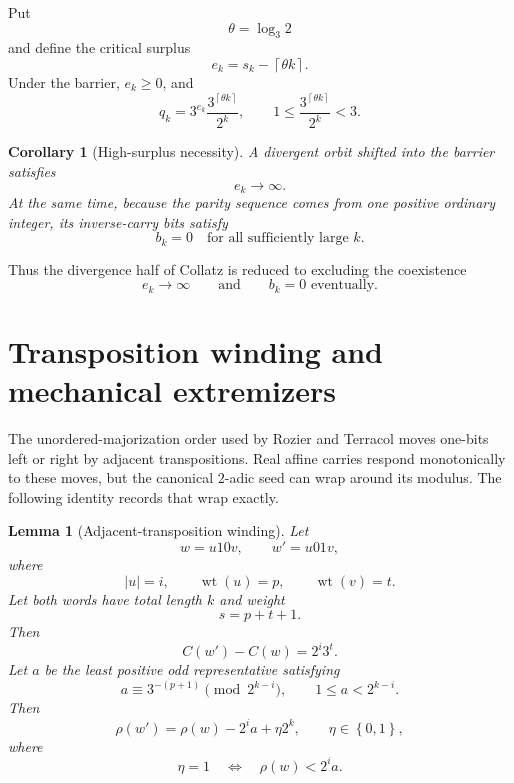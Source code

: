 \documentclass[11pt,reqno]{amsart}
\numberwithin{equation}{section}
\newtheorem{lemma}[theorem]{Lemma}
\newtheorem{corollary}[theorem]{Corollary}
\theoremstyle{definition}
\theoremstyle{remark}
\newcommand{\set}[1]{\left\{#1\right\}}
\newcommand{\ceil}[1]{\left\lceil #1\right\rceil}
\DeclareMathOperator{\wt}{wt}
\begin{document}
Put
\begin{equation}\label{eq:theta}
\theta=\log_3 2
\end{equation}
and define the critical surplus
\begin{equation}\label{eq:critical-surplus}
e_k=s_k-\ceil{\theta k}.
\end{equation}
Under the barrier, $e_k\ge0$, and
\begin{equation}\label{eq:q-surplus}
q_k
=
3^{e_k}
\frac{3^{\ceil{\theta k}}}{2^k},
\qquad
1\le
\frac{3^{\ceil{\theta k}}}{2^k}
<3.
\end{equation}

\begin{corollary}[High-surplus necessity]\label{cor:high-surplus}
A divergent orbit shifted into the barrier satisfies
\begin{equation}\label{eq:e-to-infty}
e_k\longrightarrow\infty.
\end{equation}
At the same time, because the parity sequence comes from one positive
ordinary integer, its inverse-carry bits satisfy
\begin{equation}\label{eq:b-eventual-zero}
b_k=0
\quad\text{for all sufficiently large }k.
\end{equation}
\end{corollary}

Thus the divergence half of Collatz is reduced to excluding the coexistence
\[
e_k\to\infty
\qquad\text{and}\qquad
b_k=0\text{ eventually}.
\]

\section{Transposition winding and mechanical extremizers}\label{sec:winding}

The unordered-majorization order used by Rozier and Terracol moves one-bits
left or right by adjacent transpositions.  Real affine carries respond
monotonically to these moves, but the canonical $2$-adic seed can wrap around
its modulus.  The following identity records that wrap exactly.

\begin{lemma}[Adjacent-transposition winding]\label{lem:winding}
Let
\[
w=u10v,
\qquad
w'=u01v,
\]
where
\[
|u|=i,
\qquad
\wt(u)=p,
\qquad
\wt(v)=t.
\]
Let both words have total length $k$ and weight
\[
s=p+t+1.
\]
Then
\begin{equation}\label{eq:carry-transposition}
C(w')-C(w)=2^i3^t.
\end{equation}
Let $a$ be the least positive odd representative satisfying
\begin{equation}\label{eq:a-transposition}
a\equiv3^{-(p+1)}\pmod{2^{k-i}},
\qquad
1\le a<2^{k-i}.
\end{equation}
Then
\begin{equation}\label{eq:rho-transposition}
\rho(w')
=
\rho(w)-2^ia+\eta2^k,
\qquad
\eta\in\set{0,1},
\end{equation}
where
\begin{equation}\label{eq:eta-wrap}
\eta=1
\quad\Longleftrightarrow\quad
\rho(w)<2^ia.
\end{equation}
\end{lemma}
\end{document}
